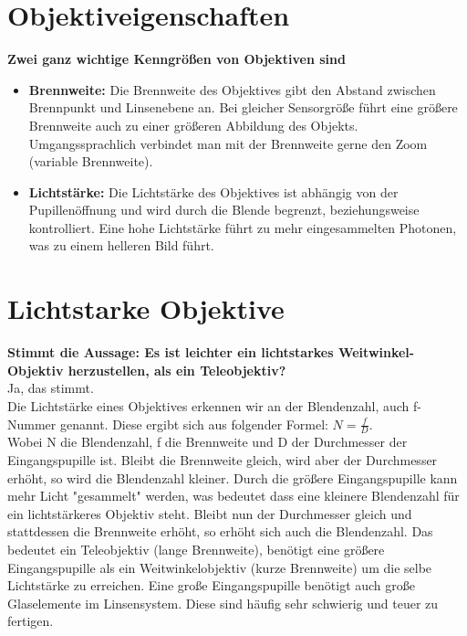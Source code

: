 \documentclass[a4paper]{article}
\begin{document}
	\section{Objektiveigenschaften}
	\textbf{Zwei ganz wichtige Kenngrößen von Objektiven sind}\\
	\begin{itemize}
		\item \textbf{Brennweite:} Die Brennweite des Objektives gibt den Abstand zwischen Brennpunkt und Linsenebene an. Bei gleicher Sensorgröße führt eine größere Brennweite auch zu einer größeren Abbildung des Objekts. Umgangssprachlich verbindet man mit der Brennweite gerne den Zoom (variable Brennweite).\\
		\item \textbf{Lichtstärke:} Die Lichtstärke des Objektives ist abhängig von der Pupillenöffnung und wird durch die Blende begrenzt, beziehungsweise kontrolliert. Eine hohe Lichtstärke führt zu mehr eingesammelten Photonen, was zu einem helleren Bild führt.\\
	\end{itemize}


	\section{Lichtstarke Objektive}
	\textbf{Stimmt die Aussage: Es ist leichter ein lichtstarkes Weitwinkel-Objektiv herzustellen, als ein Teleobjektiv?}\\
	Ja, das stimmt.\\
	Die Lichtstärke eines Objektives erkennen wir an der Blendenzahl, auch f-Nummer genannt. Diese ergibt sich aus folgender Formel: $N = \frac{f}{D}$.\\
	Wobei N die Blendenzahl, f die Brennweite und D der Durchmesser der Eingangspupille ist. Bleibt die Brennweite gleich, wird aber der Durchmesser erhöht, so wird die Blendenzahl kleiner. Durch die größere Eingangspupille kann mehr Licht "gesammelt" werden, was bedeutet dass eine kleinere Blendenzahl für ein lichtstärkeres Objektiv steht. Bleibt nun der Durchmesser gleich und stattdessen die Brennweite erhöht, so erhöht sich auch die Blendenzahl. Das bedeutet ein Teleobjektiv (lange Brennweite), benötigt eine größere Eingangspupille als ein Weitwinkelobjektiv (kurze Brennweite) um die selbe Lichtstärke zu erreichen. Eine große Eingangspupille benötigt auch große Glaselemente im Linsensystem. Diese sind häufig sehr schwierig und teuer zu fertigen.\\
	
\end{document}
